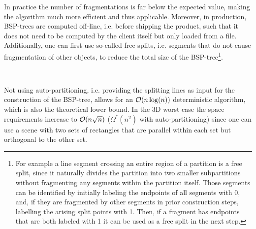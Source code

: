     \begin{remark}
         In practice the number of fragmentations is far below the expected value, making the algorithm much more efficient and thus applicable. Moreover, in production, BSP-trees are computed off-line, i.e. before shipping the product, such that it does not need to be computed by the client itself but only loaded from a file. Additionally, one can first use so-called free splits, i.e. segments that do not cause fragmentation of other objects, to reduce the total size of the BSP-tree\footnote{For example a line segment crossing an entire region of a partition is a free split, since it naturally divides the partition into two smaller subpartitions without fragmenting any segments within the partition itself. Those segments can be identified by initially labeling the endpoints of all segments with 0, and, if they are fragmented by other segments in prior construction steps, labelling the arising split points with 1. Then, if a fragment has endpoints that are both labeled with 1 it can be used as a free split in the next step.}. 
    \end{remark} \ \\

    \begin{remark}
        Not using auto-partitioning, i.e. providing the splitting lines as input for the construction of the BSP-tree, allows for an $\mathcal{O}(n\log(n))$ deterministic algorithm, which is also the theoretical lower bound. In the 3D worst case the space requirements increase to $\mathcal{O}(n\sqrt{n})$ ($\Omega^\ast(n^2)$ with auto-partitioning) since one can use a scene with two sets of rectangles that are parallel within each set but orthogonal to the other set.
    \end{remark}